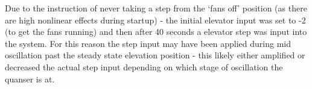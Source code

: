 Due to the instruction of never taking a step from the `fans off'
position (as there are high nonlinear effects during startup) - the
initial elevator input was set to -2 (to get the fans running) and then
after 40 seconds a elevator step was input into the system. For this
reason the step input may have been applied during mid oscillation past
the steady state elevation position - this likely either amplified or
decreased the actual step input depending on which stage of oscillation
the quanser is at.
